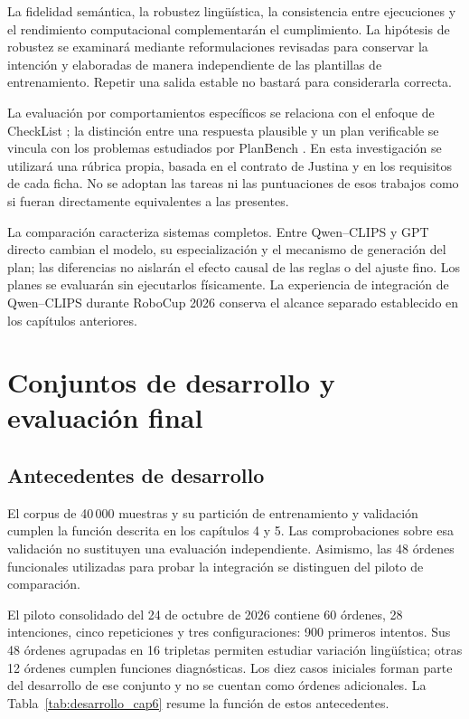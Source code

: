 La fidelidad semántica, la robustez lingüística, la consistencia entre
ejecuciones y el rendimiento computacional complementarán el cumplimiento.
La hipótesis de robustez se examinará mediante reformulaciones revisadas
para conservar la intención y elaboradas de manera independiente de las
plantillas de entrenamiento. Repetir una salida estable no bastará para
considerarla correcta.

La evaluación por comportamientos específicos se relaciona con el enfoque
de CheckList \cite{ribeiro2020checklist}; la distinción entre una respuesta
plausible y un plan verificable se vincula con los problemas estudiados
por PlanBench \cite{valmeekam2023planbench}. En esta investigación se
utilizará una rúbrica propia, basada en el contrato de Justina y en los
requisitos de cada ficha. No se adoptan las tareas ni las puntuaciones
de esos trabajos como si fueran directamente equivalentes a las presentes.

La comparación caracteriza sistemas completos. Entre Qwen--CLIPS y GPT
directo cambian el modelo, su especialización y el mecanismo de generación
del plan; las diferencias no aislarán el efecto causal de las reglas o del
ajuste fino. Los planes se evaluarán sin ejecutarlos físicamente. La
experiencia de integración de Qwen--CLIPS durante RoboCup 2026 conserva
el alcance separado establecido en los capítulos anteriores.

\section{Conjuntos de desarrollo y evaluación final}
\label{subsec:conjuntos_cap6}

\subsection{Antecedentes de desarrollo}

El corpus de 40\,000 muestras y su partición de entrenamiento y validación
cumplen la función descrita en los capítulos 4 y 5. Las comprobaciones
sobre esa validación no sustituyen una evaluación independiente.
Asimismo, las 48 órdenes funcionales utilizadas para probar la integración
se distinguen del piloto de comparación.

El piloto consolidado del 24 de octubre de 2026 contiene 60 órdenes,
28 intenciones, cinco repeticiones y tres configuraciones: 900 primeros
intentos. Sus 48 órdenes agrupadas en 16 tripletas permiten estudiar
variación lingüística; otras 12 órdenes cumplen funciones diagnósticas.
Los diez casos iniciales forman parte del desarrollo de ese conjunto y
no se cuentan como órdenes adicionales. La Tabla~\ref{tab:desarrollo_cap6}
resume la función de estos antecedentes.

